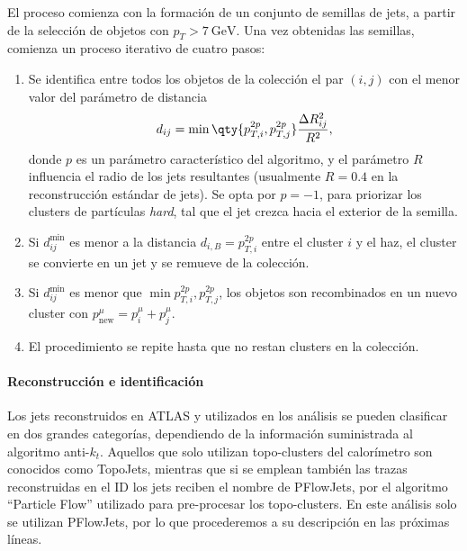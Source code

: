 El proceso comienza con la formación de un conjunto de semillas de jets, a partir de la selección de objetos con $p_T > \SI{7}{\GeV}$. Una vez obtenidas las semillas, comienza un proceso iterativo de cuatro pasos:
\begin{enumerate}
    \item Se identifica entre todos los objetos de la colección el par $(i, j)$ con el menor valor del parámetro de distancia
    \[ d_{ij} = \min\qty{p_{T,i}^{2p}, p_{T,j}^{2p}} \frac{\Delta R_{ij}^2}{R^2}, \]
    donde $p$ es un parámetro característico del algoritmo, y el parámetro $R$ influencia el radio de los jets resultantes (usualmente $R = 0.4$ en la reconstrucción estándar de jets). Se opta por $p = -1$, para priorizar los clusters de partículas \textit{hard}, tal que el jet crezca hacia el exterior de la semilla.
    \item Si $d_{ij}^{\text{min}}$ es menor a la distancia $d_{i,B} = p_{T,i}^{2p}$ entre el cluster $i$ y el haz, el cluster se convierte en un jet y se remueve de la colección.
    \item Si $d_{ij}^{\text{min}}$ es menor que $\min{p_{T,i}^{2p}, p_{T,j}^{2p}}$, los objetos son recombinados en un nuevo cluster con $p^\mu_{\text{new}} = p^\mu_i + p^\mu_j$.
    \item El procedimiento se repite hasta que no restan clusters en la colección.
\end{enumerate}


\paragraph{Reconstrucción e identificación}

Los jets reconstruidos en ATLAS y utilizados en los análisis se pueden clasificar en dos grandes categorías, dependiendo de la información suministrada al algoritmo anti-$k_t$. Aquellos que solo utilizan topo-clusters del calorímetro son conocidos como TopoJets, mientras que si se emplean también las trazas reconstruidas en el ID los jets reciben el nombre de PFlowJets, por el algoritmo ``Particle Flow'' utilizado para pre-procesar los topo-clusters. En este análisis solo se utilizan PFlowJets, por lo que procederemos a su descripción en las próximas líneas.

